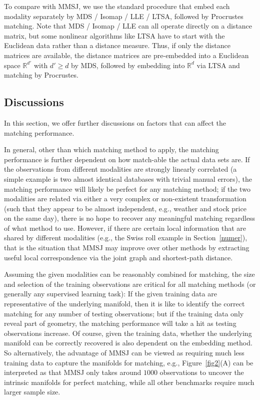 \documentclass[times,twocolumn,final]{elsarticle}
\begin{document}
To compare with MMSJ, we use the standard procedure that embed each modality separately by MDS / Isomap / LLE / LTSA, followed by Procrustes matching. Note that MDS / Isomap / LLE can all operate directly on a distance matrix, but some nonlinear algorithms like LTSA have to start with the Euclidean data rather than a distance measure. Thus, if only the distance matrices are available, the distance matrices are pre-embedded into a Euclidean space $\mathbb{R}^{d'}$ with $d' \geq d$ by MDS, followed by embedding into $\mathbb{R}^{d}$ via LTSA and matching by Procrustes.

\subsection{Discussions}
\label{discuss2}

In this section, we offer further discussions on factors that can affect the matching performance.

In general, other than which matching method to apply, the matching performance is further dependent on how match-able the actual data sets are. If the observations from different modalities are strongly linearly correlated (a simple example is two almost identical databases with trivial manual errors), the matching performance will likely be perfect for any matching method; if the two modalities are related via either a very complex or non-existent transformation (such that they appear to be almost independent, e.g., weather and stock price on the same day), there is no hope to recover any meaningful matching regardless of what method to use. However, if there are certain local information that are shared by different modalities (e.g., the Swiss roll example in Section~\ref{numer}), that is the situation that MMSJ may improve over other methods by extracting useful local correspondence via the joint graph and shortest-path distance. 

Assuming the given modalities can be reasonably combined for matching, the size and selection of the training observations are critical for all matching methods (or generally any supervised learning task): If the given training data are representative of the underlying manifold, then it is like to identify the correct matching for any number of testing observations; but if the training data only reveal part of geometry, the matching performance will take a hit as testing observations increase. Of course, given the training data, whether the underlying manifold can be correctly recovered is also dependent on the embedding method. So alternatively, the advantage of MMSJ can be viewed as requiring much less training data to capture the manifolds for matching, e.g., Figure~\ref{fig2}(A) can be interpreted as that MMSJ only takes around $1000$ observations to uncover the intrinsic manifolds for perfect matching, while all other benchmarks require much larger sample size.
\end{document}
